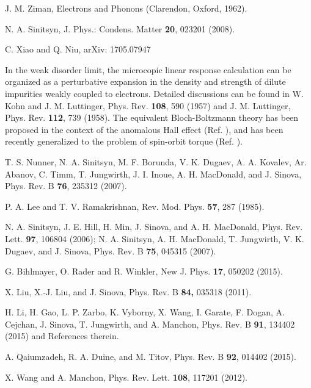 \documentclass
[aps,pra,amsfonts,amssymb,twocolumn,amsmath,preprintnumbers,nofootinbib,floatfix,
showpacs,superscriptaddress]{revtex4-1}%
\begin{document}
\begin{thebibliography}{99}                                                                                               %


J. M. Ziman, {\itshape}Electrons and Phonons (Clarendon,
Oxford, 1962).

N. A. Sinitsyn, J. Phys.: Condens. Matter \textbf{20},
023201 (2008).

C. Xiao and Q. Niu, arXiv: 1705.07947

In the weak disorder limit, the microcopic linear response
calculation can be organized as a perturbative expansion in the density and
strength of dilute impurities weakly coupled to electrons. Detailed
discussions can be found in W. Kohn and J. M. Luttinger, Phys. Rev.
\textbf{108}, 590 (1957) and J. M. Luttinger, Phys. Rev. \textbf{112}, 739
(1958). The equivalent Bloch-Boltzmann theory has been proposed in the context
of the anomalous Hall effect (Ref. ), and has been
recently generalized to the problem of spin-orbit torque (Ref. ).

T. S. Nunner, N. A. Sinitsyn, M. F. Borunda, V. K.
Dugaev, A. A. Kovalev, Ar. Abanov, C. Timm, T. Jungwirth, J. I. Inoue, A. H.
MacDonald, and J. Sinova, Phys. Rev. B \textbf{76}, 235312 (2007).

P. A. Lee and T. V. Ramakrishnan, Rev. Mod. Phys.
\textbf{57}, 287 (1985).

N. A. Sinitsyn, J. E. Hill, H. Min, J. Sinova, and A. H.
MacDonald, Phys. Rev. Lett. \textbf{97}, 106804 (2006); N. A. Sinitsyn, A. H.
MacDonald, T. Jungwirth, V. K. Dugaev, and J. Sinova, Phys. Rev. B
\textbf{75}, 045315 (2007).

G. Bihlmayer, O. Rader and R. Winkler, New J. Phys.
\textbf{17}, 050202 (2015).

X. Liu, X.-J. Liu, and J. Sinova, Phys. Rev. B \textbf{84,}
035318 (2011).

H. Li, H. Gao, L. P. Zarbo, K. Vyborny, X. Wang, I. Garate,
F. Dogan, A. Cejchan, J. Sinova, T. Jungwirth, and A. Manchon, Phys. Rev. B
\textbf{91}, 134402 (2015) and References therein.

A. Qaiumzadeh, R. A. Duine, and M. Titov, Phys. Rev. B
\textbf{92}, 014402 (2015).

X. Wang and A. Manchon, Phys. Rev. Lett. \textbf{108},
117201 (2012).


\end{thebibliography}
\end{document}
